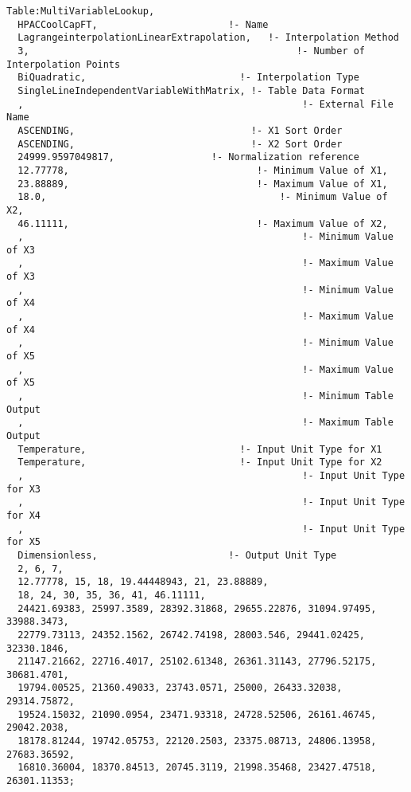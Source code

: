 \begin{lstlisting}
Table:MultiVariableLookup,
  HPACCoolCapFT,                       !- Name
  LagrangeinterpolationLinearExtrapolation,   !- Interpolation Method
  3,                                               !- Number of Interpolation Points
  BiQuadratic,                           !- Interpolation Type
  SingleLineIndependentVariableWithMatrix, !- Table Data Format
  ,                                                 !- External File Name
  ASCENDING,                               !- X1 Sort Order
  ASCENDING,                               !- X2 Sort Order
  24999.9597049817,                 !- Normalization reference
  12.77778,                                 !- Minimum Value of X1,
  23.88889,                                 !- Maximum Value of X1,
  18.0,                                         !- Minimum Value of X2,
  46.11111,                                 !- Maximum Value of X2,
  ,                                                 !- Minimum Value of X3
  ,                                                 !- Maximum Value of X3
  ,                                                 !- Minimum Value of X4
  ,                                                 !- Maximum Value of X4
  ,                                                 !- Minimum Value of X5
  ,                                                 !- Maximum Value of X5
  ,                                                 !- Minimum Table Output
  ,                                                 !- Maximum Table Output
  Temperature,                           !- Input Unit Type for X1
  Temperature,                           !- Input Unit Type for X2
  ,                                                 !- Input Unit Type for X3
  ,                                                 !- Input Unit Type for X4
  ,                                                 !- Input Unit Type for X5
  Dimensionless,                       !- Output Unit Type
  2, 6, 7,
  12.77778, 15, 18, 19.44448943, 21, 23.88889,
  18, 24, 30, 35, 36, 41, 46.11111,
  24421.69383, 25997.3589, 28392.31868, 29655.22876, 31094.97495, 33988.3473,
  22779.73113, 24352.1562, 26742.74198, 28003.546, 29441.02425, 32330.1846,
  21147.21662, 22716.4017, 25102.61348, 26361.31143, 27796.52175, 30681.4701,
  19794.00525, 21360.49033, 23743.0571, 25000, 26433.32038, 29314.75872,
  19524.15032, 21090.0954, 23471.93318, 24728.52506, 26161.46745, 29042.2038,
  18178.81244, 19742.05753, 22120.2503, 23375.08713, 24806.13958, 27683.36592,
  16810.36004, 18370.84513, 20745.3119, 21998.35468, 23427.47518, 26301.11353;
\end{lstlisting}

